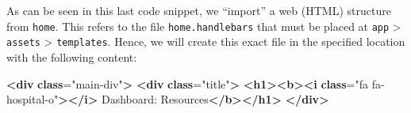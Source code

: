 \documentclass[
  11pt,
]{krantz}
\newenvironment{Shaded}{\begin{snugshade}}{\end{snugshade}}
\newcommand{\ErrorTok}[1]{\textcolor[rgb]{0.14,0.14,0.14}{\textbf{#1}}}
\newcommand{\KeywordTok}[1]{\textcolor[rgb]{0.27,0.27,0.27}{\textbf{#1}}}
\newcommand{\NormalTok}[1]{#1}
\newcommand{\OtherTok}[1]{\textcolor[rgb]{0.37,0.37,0.37}{#1}}
\newcommand{\StringTok}[1]{\textcolor[rgb]{0.5,0.5,0.5}{#1}}
\begin{document}
As can be seen in this last code snippet, we ``import'' a web (HTML) structure from \texttt{\textquotesingle{}home\textquotesingle{}}. This refers to the file \texttt{home.handlebars} that must be placed at \texttt{app} \textgreater{} \texttt{assets} \textgreater{} \texttt{templates}. Hence, we will create this exact file in the specified location with the following content:

\begin{Shaded}
\begin{Highlighting}[]
\KeywordTok{\textless{}div} \ErrorTok{class}\OtherTok{=}\StringTok{"main{-}div"}\KeywordTok{\textgreater{}}
    \KeywordTok{\textless{}div} \ErrorTok{class}\OtherTok{=}\StringTok{"title"}\KeywordTok{\textgreater{}}
        \KeywordTok{\textless{}h1\textgreater{}\textless{}b\textgreater{}\textless{}i} \ErrorTok{class}\OtherTok{=}\StringTok{"fa fa{-}hospital{-}o"}\KeywordTok{\textgreater{}\textless{}/i\textgreater{}}\NormalTok{ Dashboard: Resources}\KeywordTok{\textless{}/b\textgreater{}\textless{}/h1\textgreater{}}
    \KeywordTok{\textless{}/div\textgreater{}}


\end{Highlighting}
\end{Shaded}
\end{document}
